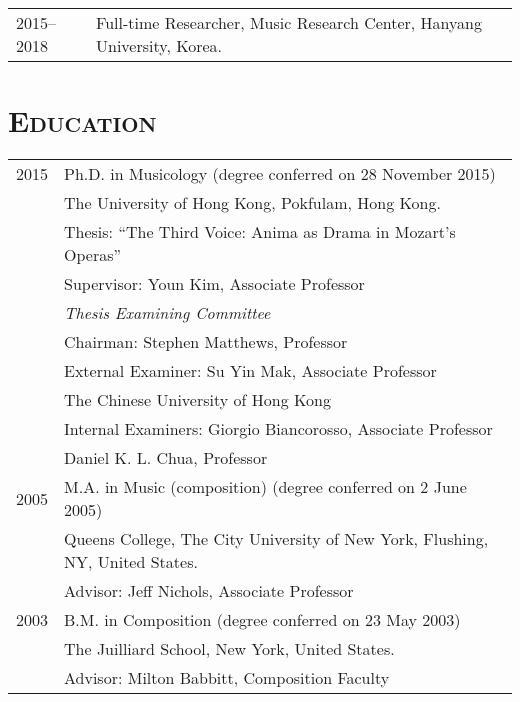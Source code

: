 \documentclass[a4paper,11pt]{article}
\begin{document}
  \hspace*{-0.25cm}
  \begin{tabular}{p{2.5cm} l}
    2015--2018 & Full-time Researcher, Music Research Center, Hanyang University, Korea.
  \end{tabular}
  
  \vspace*{2.5mm}
  
  \section*{\textsc{Education}}
  
  \hspace*{-0.25cm}
  \begin{tabular}{p{2.5cm} l}
    2015 & Ph.D. in Musicology (degree conferred on 28 November 2015)\\
    & The University of Hong Kong, Pokfulam, Hong Kong.\\
    & Thesis: ``The Third Voice: Anima as Drama in Mozart's Operas''\\
    & Supervisor: Youn Kim, Associate Professor\\[2mm]
    & \textit{Thesis Examining Committee}\\
    & Chairman: Stephen Matthews, Professor\\
    & External Examiner: Su Yin Mak, Associate Professor\\
    & \hspace*{28.5mm} The Chinese University of Hong Kong\\
    & Internal Examiners: Giorgio Biancorosso, Associate Professor\\
    & \hspace*{29.5mm} Daniel K. L. Chua, Professor\\[2mm]
    
	2005 & M.A. in Music (composition) (degree conferred on 2 June 2005)\\
	& Queens College, The City University of New York, Flushing, NY, United States.\\
	& Advisor: Jeff Nichols, Associate Professor\\[2mm]

    2003 & B.M. in Composition (degree conferred on 23 May 2003)\\
    & The Juilliard School, New York, United States.\\
    & Advisor: Milton Babbitt, Composition Faculty
  \end{tabular}
  
\end{document}
